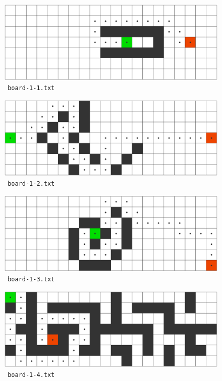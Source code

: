 \begin{figure}[H]
\includegraphics[width=\textwidth]{images/board-1-1}
\caption{\texttt{~board-1-1.txt~}}
\end{figure}

\begin{figure}[H]
\includegraphics[width=\textwidth]{images/board-1-2}
\caption{\texttt{~board-1-2.txt~}}
\end{figure}

\begin{figure}[H]
\includegraphics[width=\textwidth]{images/board-1-3}
\caption{\texttt{~board-1-3.txt~}}
\end{figure}

\begin{figure}[H]
\includegraphics[width=\textwidth]{images/board-1-4}
\caption{\texttt{~board-1-4.txt~}}
\end{figure}


